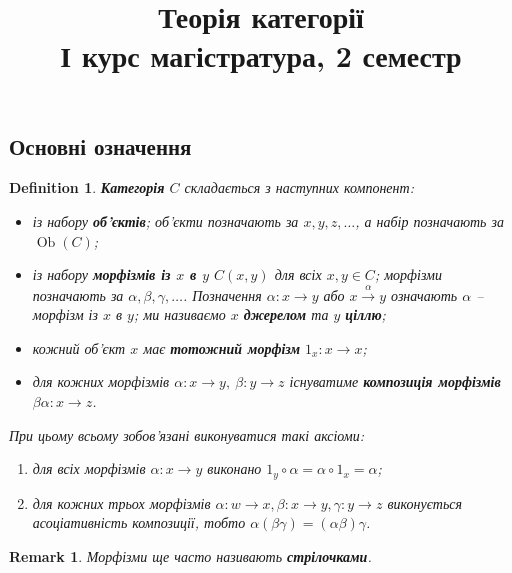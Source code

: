 \documentclass[a4paper, 10pt]{article}
\title{Теорія категорії \\ І курс магістратура, 2 семестр}
\theoremstyle{theoremdd}
\newtheorem{definition}[theorem]{Definition}
\newtheorem{remark}[theorem]{Remark}
\DeclareMathOperator{\Ob}{Ob}
\begin{document}
\maketitle
\newpage
\subsection{Основні означення}
\begin{definition}
\textbf{Категорія} $C$ складається з наступних компонент:
\begin{itemize}[nosep, wide=0pt, label={--}]
\item із набору \textbf{об'єктів}; об'єкти позначають за $x,y,z,\dots$, а набір позначають за $\Ob(C)$;
\item із набору \textbf{морфізмів із $x$ в $y$} $C(x,y)$ для всіх $x,y \in C$; морфізми позначають за $\alpha,\beta,\gamma,\dots$. Позначення $\alpha \colon x \to y$ або $x \overset{\alpha}{\to} y$ означають $\alpha$ -- морфізм із $x$ в $y$; ми називаємо $x$ \textbf{джерелом} та $y$ \textbf{ціллю};
\item кожний об'єкт $x$ має \textbf{тотожний морфізм} $1_x \colon x \to x$;
\item для кожних морфізмів $\alpha \colon x \to y,\ \beta \colon y \to z$ існуватиме \textbf{композиція морфізмів} $\beta \alpha \colon x \to z$.
\end{itemize}
При цьому всьому зобов'язані виконуватися такі аксіоми:
\begin{center}
\begin{enumerate}[nosep,wide=0pt,label={\arabic*)}]
\item для всіх морфізмів $\alpha \colon x \to y$ виконано $1_y \circ \alpha = \alpha \circ 1_x = \alpha$;
\item для кожних трьох морфізмів $\alpha \colon w \to x, \beta \colon x \to y, \gamma \colon y \to z$ виконується асоціативність композиції, тобто $\alpha (\beta \gamma) = (\alpha \beta) \gamma$.
\end{enumerate}
\end{center}
\end{definition}

\begin{remark}
Морфізми ще часто називають \textbf{стрілочками}.
\end{remark}
\end{document}
